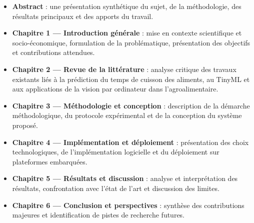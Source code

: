 \begin{itemize}
	\item \textbf{Abstract} : une présentation synthétique du sujet, de la méthodologie, des résultats principaux et des apports du travail.
	\item \textbf{Chapitre 1 — Introduction générale} : mise en contexte scientifique et socio-économique, formulation de la problématique, présentation des objectifs et contributions attendues.
	\item \textbf{Chapitre 2 — Revue de la littérature} : analyse critique des travaux existants liés à la prédiction du temps de cuisson des aliments, au TinyML et aux applications de la vision par ordinateur dans l’agroalimentaire.
	\item \textbf{Chapitre 3 — Méthodologie et conception} : description de la démarche méthodologique, du protocole expérimental et de la conception du système proposé.
	\item \textbf{Chapitre 4 — Implémentation et déploiement} : présentation des choix technologiques, de l’implémentation logicielle et du déploiement sur plateformes embarquées.
	\item \textbf{Chapitre 5 — Résultats et discussion} : analyse et interprétation des résultats, confrontation avec l’état de l’art et discussion des limites.
	\item \textbf{Chapitre 6 — Conclusion et perspectives} : synthèse des contributions majeures et identification de pistes de recherche futures.
\end{itemize}
